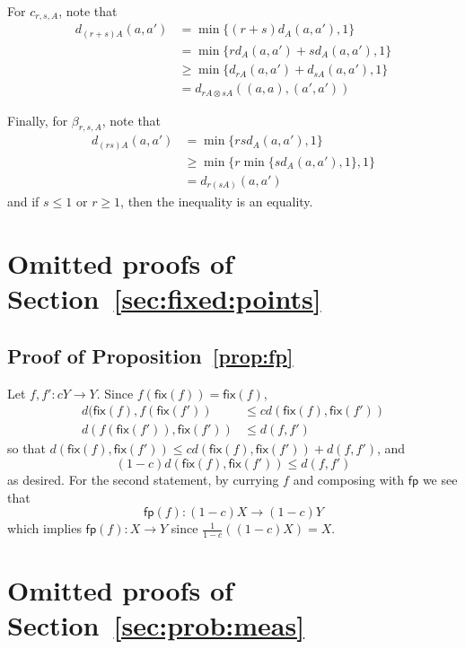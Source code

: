 \documentclass[a4paper,UKenglish,cleveref, autoref, thm-restate]{lipics-v2021}
\newcommand{\mprod}{\otimes}
\newcommand{\semfp}{\mathsf{fp}}
\newcommand{\semfix}{\mathsf{fix}}
\newcommand{\asmap}{\beta} %
\begin{document}
For $c_{r,s,A}$, note that 
\begin{align*}
d_{(r+s)A}(a,a')
    &= \min\{(r+s)d_A(a,a'), 1 \} \\
    &= \min \{ rd_A(a,a')+ sd_A(a,a'), 1 \} \\
    &\geq \min \{ d_{rA}(a,a') + d_{sA}(a,a') ,1\} \\
    &= d_{rA\mprod sA}((a,a),(a',a')) 
\end{align*}

Finally, for $\asmap_{r,s,A}$, note that 
\begin{align*}
 d_{(rs)A}(a,a') 
 &=\min\{ rsd_A(a,a'), 1 \} \\
 & \geq \min \{ r \min \{ sd_A(a,a'),1 \},1 \} \\
 &= d_{r(sA)}(a,a')
\end{align*}
and if $s\leq 1$ or $r\geq 1$, then the inequality is an equality. 

\section{Omitted proofs of Section~\ref{sec:fixed:points}}

\subsection*{Proof of Proposition~\ref{prop:fp}}
 Let $f,f' \colon cY \to Y$. Since $f(\semfix(f)) = \semfix(f)$,
\begin{align*}
 d(\semfix (f), f(\semfix (f')) & \leq cd(\semfix(f), \semfix(f')) \\
 d(f(\semfix(f')), \semfix(f')) & \leq d(f,f') 
\end{align*}
so that $d(\semfix (f), \semfix (f')) \leq cd(\semfix(f), \semfix(f')) + d(f,f')$, and %
\[
 (1-c)d(\semfix (f), \semfix (f')) \leq d(f,f')
\]
as desired. For the second statement, by currying $f$ and composing with $\semfp$ we see that
\[
  \semfp(f) \colon (1-c)X \to (1-c) Y
\]
which implies $\semfp(f) \colon X \to Y$ since $\frac1{1-c}((1-c)X) = X$.  


\section{Omitted proofs of Section~\ref{sec:prob:meas}}
\end{document}
